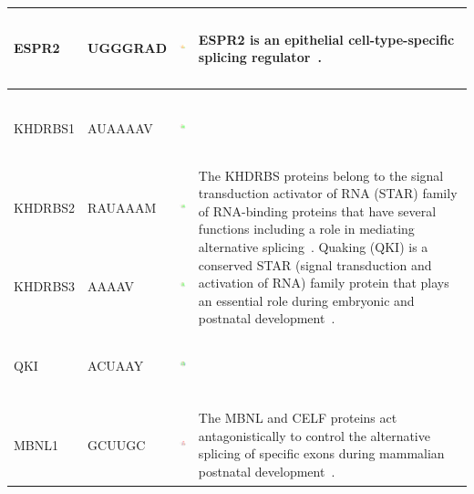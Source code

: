 \documentclass[a4paper,10pt]{article}
\begin{document}
\begin{center}
\begin{longtable}{|l|l|l|p{6cm}|}
 \hline
 ESPR2 & UGGGRAD &  \includegraphics[height=0.8in]{./seqLogo/ESRP2_ugggrad.pdf} &ESPR2  is an epithelial cell-type-specific splicing regulator~\cite{Warzecha2009}.\\
 \hline
KHDRBS1 & AUAAAAV &  \includegraphics[height=0.8in]{./seqLogo/KHDRBS1_auaaaav.pdf} & \multirow{4}{6cm}{The KHDRBS proteins belong to the signal transduction activator of 
RNA (STAR) family of RNA-binding proteins that have several functions including a role in mediating alternative splicing~\cite{Matter2002}.  Quaking (QKI) is a conserved STAR (signal transduction and activation of RNA) family protein that plays an essential role during embryonic and postnatal development~\cite{Miguel2016}.} \\
KHDRBS2 & RAUAAAM & \includegraphics[height=0.8in]{./seqLogo/KHDRBS2_rauaaam.pdf}& \\
KHDRBS3 & AAAAV & \includegraphics[height=0.8in]{./seqLogo/KHDRBS3_auaaav.pdf}& \\
QKI & ACUAAY & \includegraphics[height=0.8in]{./seqLogo/QKI_acuaay.pdf} & \\
\hline
MBNL1 & GCUUGC & \includegraphics[height=0.8in]{./seqLogo/MBNL1_gcuugc.pdf} & The MBNL and CELF proteins act antagonistically to control the alternative splicing of specific exons during mammalian postnatal development~\cite{Yuan2007}. \\

\end{longtable}
\end{center}
\end{document}
